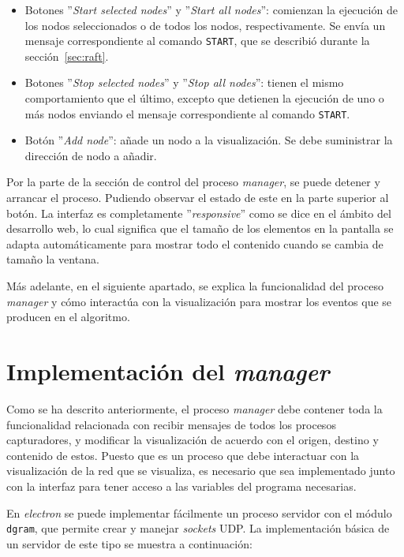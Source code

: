 \begin{itemize}
\item Botones ''\textit{Start selected nodes}'' y ''\textit{Start all nodes}'': comienzan la ejecución de los nodos seleccionados o de todos los nodos, respectivamente. Se envía un mensaje correspondiente al comando \texttt{START}, que se describió durante la sección~\ref{sec:raft}.

\item Botones ''\textit{Stop selected nodes}'' y ''\textit{Stop all nodes}'': tienen el mismo comportamiento que el último, excepto que detienen la ejecución de uno o más nodos enviando el mensaje correspondiente al comando \texttt{START}.

\item Botón ''\textit{Add node}'': añade un nodo a la visualización. Se debe suministrar la dirección de nodo a añadir.
\end{itemize}

Por la parte de la sección de control del proceso \textit{manager}, se puede detener y arrancar el proceso. Pudiendo observar el estado de este en la parte superior al botón. La interfaz es completamente ''\textit{responsive}'' como se dice en el ámbito del desarrollo web, lo cual significa que el tamaño de los elementos en la pantalla se adapta automáticamente para mostrar todo el contenido cuando se cambia de tamaño la ventana.

Más adelante, en el siguiente apartado, se explica la funcionalidad del proceso \textit{manager} y cómo interactúa con la visualización para mostrar los eventos que se producen en el algoritmo. 

\section{Implementación del \textit{manager}}

Como se ha descrito anteriormente, el proceso \textit{manager} debe contener toda la funcionalidad relacionada con recibir mensajes de todos los procesos capturadores, y modificar la visualización de acuerdo con el origen, destino y contenido de estos. Puesto que es un proceso que debe interactuar con la visualización de la red que se visualiza, es necesario que sea implementado junto con la interfaz para tener acceso a las variables del programa necesarias.

En \textit{electron} se puede implementar fácilmente un proceso servidor con el módulo \texttt{dgram}, que permite crear y manejar \textit{sockets} UDP. La implementación básica de un servidor de este tipo se muestra a continuación:

